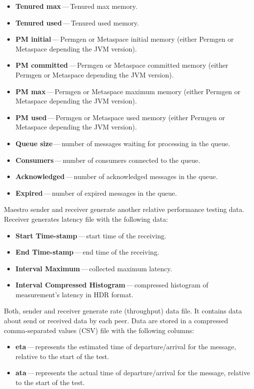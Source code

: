 \begin{itemize}
	\item \textbf{Tenured max}\,---\,Tenured max memory.
	\item \textbf{Tenured used}\,---\,Tenured used memory.
	\item \textbf{PM initial}\,---\,Permgen or Metaspace initial memory (either Permgen or Metaspace depending the JVM version).
	\item \textbf{PM committed}\,---\,Permgen or Metaspace committed memory (either Permgen or Metaspace depending the JVM version).
	\item \textbf{PM max}\,---\,Permgen or Metaspace maximum memory (either Permgen or Metaspace depending the JVM version).
	\item \textbf{PM used}\,---\,Permgen or Metaspace used memory (either Permgen or Metaspace depending the JVM version).
	\item \textbf{Queue size}\,---\,number of messages waiting for processing in the queue.
	\item \textbf{Consumers}\,---\,number of consumers connected to the queue.
	\item \textbf{Acknowledged}\,---\,number of acknowledged messages in the queue.
	\item \textbf{Expired}\,---\,number of expired messages in the queue.
\end{itemize}

Maestro sender and receiver generate another relative performance testing data. Receiver generates latency file with the following data:

\begin{itemize}
	\setlength\itemsep{0em}
	\item \textbf{Start Time-stamp}\,---\,start time of the receiving.
	\item \textbf{End Time-stamp}\,---\,end time of the receiving.
	\item \textbf{Interval Maximum}\,---\,collected maximum latency.
	\item \textbf{Interval Compressed Histogram}\,---\,compressed histogram of measurement's latency in HDR\footnotemark{} format.
\end{itemize}

Both, sender and receiver generate rate (throughput) data file. It contains data about send or received data by each peer. Data are stored in a compressed comma-separated values (CSV) file with the following columns:

\begin{itemize}
	\setlength\itemsep{0em}
	\item \textbf{eta}\,---\,represents the estimated time of departure/arrival for the message, relative to the start of the test.
	\item \textbf{ata}\,---\,represents the actual time of departure/arrival for the message, relative to the start of the test.
\end{itemize}

